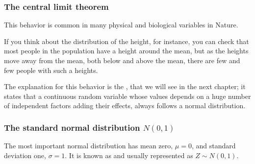 \begin{frame}
\frametitle{The central limit theorem}
This behavior is common in many physical and biological variables in Nature.

If you think about the distribution of the height, for instance, you can check that most people in the population have a height around the mean, but as the heights move away from the mean, both below and above the mean, there are few and few people with such a heights.

The explanation for this behavior is the , that we will see in the next
chapter; it states that a continuous random variable whose values depends on a huge number of independent factors adding their effects, always follows a normal distribution.
\end{frame}


\begin{frame}
\frametitle{The standard normal distribution $N(0,1)$}
The most important normal distribution has mean zero, $\mu=0$, and standard deviation one, $\sigma=1$.
It is known as  and usually represented as $Z\sim N(0,1)$.
\begin{center}
\end{center}
\end{frame}


